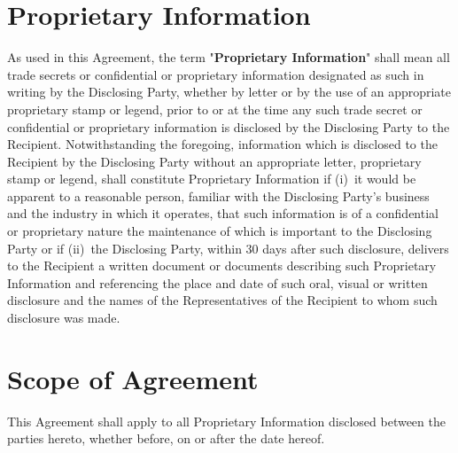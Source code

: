 \documentclass[12pt]{article}
\begin{document}
\section{Proprietary Information}
As used in this Agreement, the term "{\bf Proprietary Information}" shall mean all trade secrets or confidential or proprietary information designated as such in writing by the Disclosing Party, whether by letter or by the use of an appropriate proprietary stamp or legend, prior to or at the time any such trade secret or confidential or proprietary information is disclosed by the Disclosing Party to the Recipient. Notwithstanding the foregoing, information which is disclosed to the Recipient by the Disclosing Party without an appropriate letter, proprietary stamp or legend, shall constitute Proprietary Information if (i) it would be apparent to a reasonable person, familiar with the Disclosing Party’s business and the industry in which it operates, that such information is of a confidential or proprietary nature the maintenance of which is important to the Disclosing Party or if (ii) the Disclosing Party, within 30 days after such disclosure, delivers to the Recipient a written document or documents describing such Proprietary Information and referencing the place and date of such oral, visual or written disclosure and the names of the Representatives of the Recipient to whom such disclosure was made.

\section{Scope of Agreement}
This Agreement shall apply to all Proprietary Information disclosed between the parties hereto, whether before, on or after the date hereof.
\end{document}
